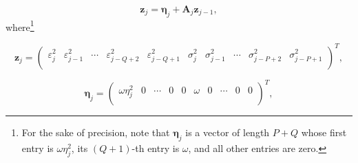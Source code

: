 \documentclass[10pt,a4paper,oneside]{article}
\begin{document}
\begin{equation}
    \mathbf{z}_j = \boldsymbol{\eta}_j + \mathbf{A}_j \mathbf{z}_{j - 1},
    \label{eq:markov_rep_garch}
\end{equation}
where\footnote{For the sake of precision, note that $\boldsymbol{\eta}_j$ is a vector of length $P+Q$ whose first entry is $\omega \eta_j^2$, its $(Q+1)$-th entry is $\omega$, and all other entries are zero.}

\[
    \mathbf{z}_j =
    \begin{pmatrix}
        \varepsilon_j^2 & \varepsilon_{j - 1}^2 & \cdots & \varepsilon_{j - Q + 2}^2 & \varepsilon_{j - Q + 1}^2 & \sigma^2_{j} & \sigma^2_{j - 1} & \cdots & \sigma^2_{j - P + 2} & \sigma^2_{j - P + 1} \\
    \end{pmatrix}^T,
\]


\[
    \mathbf{\eta}_j =
    \begin{pmatrix}
        \omega \eta_j^2 & 0 & \cdots & 0 & 0 & \omega & 0 & \cdots & 0 & 0 \\
    \end{pmatrix}^T,
\]
\end{document}
